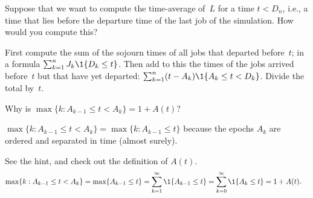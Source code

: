 \documentclass[queueing-book.tex]{subfiles}
\begin{document}
\begin{exercise}
Suppose that we want to compute the time-average of~$L$ for a time $t<D_{n}$, i.e., a time that lies before the departure time of the last job of the simulation. How would you compute this?
\begin{solution}
First compute the sum of the sojourn times of all jobs that departed before~$t$; in a formula $\sum_{k=1}^{n}J_k \1{D_k\leq t}$. Then add to this the times of the jobs arrived before~$t$  but that have yet departed:  $\sum_{k=1}^n (t-A_k)\1{A_k\leq t < D_{k}}$. Divide the total by~$t$.
\end{solution}
\end{exercise}

\begin{exercise}\label{ex:55}
Why is $\max\{k: A_{k-1} \leq t < A_{k}\} = 1 + A(t)$?
\begin{hint}
$\max\{k: A_{k-1} \leq t < A_{k}\} = \max\{k : A_{k-1} \leq t\}$ because the epochs $A_{k}$ are ordered and separated  in time (almost surely).
\end{hint}
\begin{solution}
See the hint, and check out the definition of $A(t)$.
\begin{align*}
  \max\{k: A_{k-1} \leq t < A_{k}\} &= \max\{A_{k-1} \leq t\} = \sum_{k=1}^{\infty} \1{A_{k-1}\leq t} = \sum_{k=0}^{\infty} \1{A_{k}\leq t}  =  1 + A(t).
\end{align*}
\end{solution}
\end{exercise}



\end{document}
